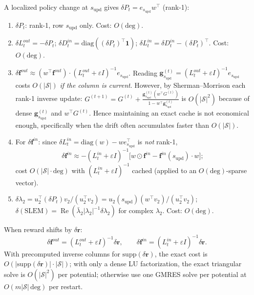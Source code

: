 \documentclass[10pt,a4paper]{article}
\begin{document}
A localized policy change at $s_{\mathrm{upd}}$ gives $\delta P_t = e_{s_{\mathrm{upd}}} w^\top$ (rank-1):
\begin{enumerate}\setlength\itemsep{1pt}
  \item $\delta P_t$: rank-1, row $s_{\mathrm{upd}}$ only. Cost: $O(\mathrm{deg})$.
  \item $\delta L^{out}_t = -\delta P_t$; $\delta D^{in}_t = \mathrm{diag}((\delta P_t)^\top\mathbf{1})$;
        $\delta L^{in}_t = \delta D^{in}_t - (\delta P_t)^\top$.  Cost: $O(\mathrm{deg})$.
  \item $\delta\mathbf{f}^{out} \approx (w^\top\mathbf{f}^{out})\cdot(L^{out}_t+\varepsilon I)^{-1}e_{s_{\mathrm{upd}}}$.
        Reading $\mathbf{g}_{s_{\mathrm{upd}}}^{(t)} = (L^{out}_t+\varepsilon I)^{-1}e_{s_{\mathrm{upd}}}$ costs $O(|\mathcal{S}|)$ \emph{if the column is current}.
        However, by Sherman--Morrison each rank-1 inverse update:
        $G^{(t+1)} = G^{(t)} + \tfrac{\mathbf{g}_{s_{\mathrm{upd}}}^{(t)}(w^\top G^{(t)})}{1-w^\top\mathbf{g}_{s_{\mathrm{upd}}}^{(t)}}$ is $O(|\mathcal{S}|^2)$ because of dense $\mathbf{g}_{s_{\mathrm{upd}}}^{(t)}$ and $w^\top G^{(t)}$.
        Hence maintaining an exact cache is not economical enough, specifically when the drift often accumulates faster than $O(|\mathcal{S}|)$.
  \item For $\delta\mathbf{f}^{in}$: since $\delta L^{in}_t = \mathrm{diag}(w) - we_{s_{\mathrm{upd}}}^\top$ is \emph{not} rank-1,
        \[\delta\mathbf{f}^{in} \approx -(L^{in}_t+\varepsilon I)^{-1}\bigl[w\odot\mathbf{f}^{in} - \mathbf{f}^{in}(s_{\mathrm{upd}})\cdot w\bigr];\]
        cost $O(|\mathcal{S}|\cdot\mathrm{deg})$ with $(L^{in}_t+\varepsilon I)^{-1}$ cached (applied to an $O(\mathrm{deg})$-sparse vector).
  \item $\delta\lambda_2 = u_2^\top(\delta P_t)v_2/(u_2^\top v_2) = u_2(s_{\mathrm{upd}})(w^\top v_2)/(u_2^\top v_2)$;
        $\delta(\mathrm{SLEM}) = \operatorname{Re}(\bar\lambda_2|\lambda_2|^{-1}\delta\lambda_2)$ for complex $\lambda_2$.
        Cost: $O(\mathrm{deg})$.
\end{enumerate}

When reward shifts by $\delta\mathbf{r}$:
\[
  \delta\mathbf{f}^{out} = (L^{out}_t+\varepsilon I)^{-1}\delta\mathbf{r}, \qquad
  \delta\mathbf{f}^{in} = (L^{in}_t+\varepsilon I)^{-1}\delta\mathbf{r}.
\]
With precomputed inverse columns for $\mathrm{supp}(\delta\mathbf{r})$, the exact cost is
$O(|\mathrm{supp}(\delta\mathbf{r})|\cdot|\mathcal{S}|)$; with only a dense LU factorization,
the exact triangular solve is $O(|\mathcal{S}|^2)$ per potential; otherwise use one GMRES solve per
potential at $O(m|\mathcal{S}|\,\mathrm{deg})$ per restart.
\end{document}
